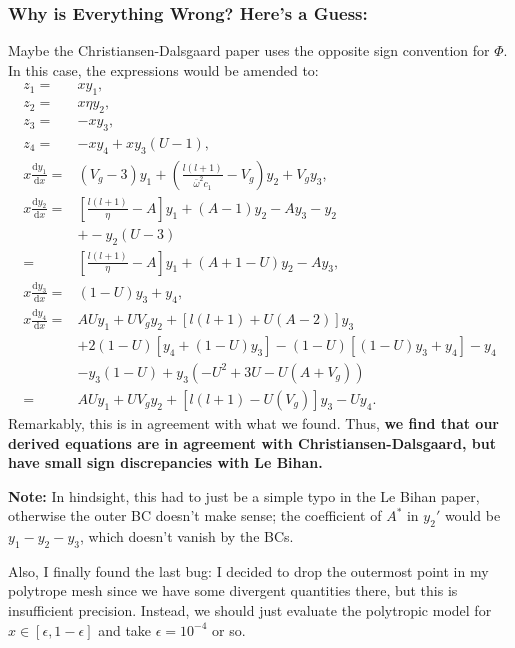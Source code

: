 \documentclass[11pt,
        usenames, %
        twocolumn,
        landscape,
        dvipsnames %
    ]{article}
\newcommand*{\rd}[2]{\frac{\mathrm{d}#1}{\mathrm{d}#2}}
\newcommand*{\p}[1]{\left(#1\right)}
\newcommand*{\s}[1]{\left[#1\right]}
\begin{document}
\subsubsection{Why is Everything Wrong? Here's a Guess:}

Maybe the Christiansen-Dalsgaard paper uses the opposite sign convention for
$\Phi$. In this case, the expressions would be amended to:
\begin{align}
    z_1 ={}& xy_1,\\
    z_2 ={}& x\eta y_2,\\
    z_3 ={}& -xy_3,\\
    z_4 ={}& -xy_4 + xy_3(U - 1),\\
    x\rd{y_1}{x} ={}& \p{V_g - 3}y_1
        + \p{\frac{l(l+1)}{\bar{\omega}^2c_1} - V_g}y_2
        + V_gy_3,\\
    x\rd{y_2}{x}
        ={}& \s{\frac{l(l+1)}{\eta} - A}y_1
                + (A - 1)y_2
                - Ay_3
                - y_2\nonumber\\
            &+ - y_2(U - 3)\nonumber\\
        ={}& \s{\frac{l(l+1)}{\eta} - A}y_1
                + (A + 1 - U)y_2
                - Ay_3,\\
    x\rd{y_3}{x} ={}& (1 - U)y_3 + y_4,\\
    x\rd{y_4}{x} ={}& AUy_1
            + UV_gy_2
            + \s{l(l+1) + U(A - 2)}y_3\nonumber\\
            &+ 2(1 - U)\s{y_4 + (1 - U)y_3}
            - (1 - U)\s{(1 - U)y_3 + y_4}
            - y_4\nonumber\\
            &- y_3(1 - U)
            + y_3\p{-U^2 + 3U - U(A + V_g)}\nonumber\\
        ={}& AUy_1
            + UV_gy_2
            + \s{l(l+1) - U(V_g) }y_3 - Uy_4.
\end{align}
Remarkably, this is in agreement with what we found. Thus, \textbf{we find that
our derived equations are in agreement with Christiansen-Dalsgaard, but have
small sign discrepancies with Le Bihan.}

\textbf{Note:} In hindsight, this had to just be a simple typo in the Le Bihan
paper, otherwise the outer BC doesn't make sense; the coefficient of $A^*$ in
$y_2'$ would be $y_1 - y_2 - y_3$, which doesn't vanish by the BCs.

Also, I finally found the last bug: I decided to drop the outermost point in my
polytrope mesh since we have some divergent quantities there, but this is
insufficient precision. Instead, we should just evaluate the polytropic model
for $x \in \s{\epsilon, 1 - \epsilon}$ and take $\epsilon = 10^{-4}$ or so.
\end{document}
